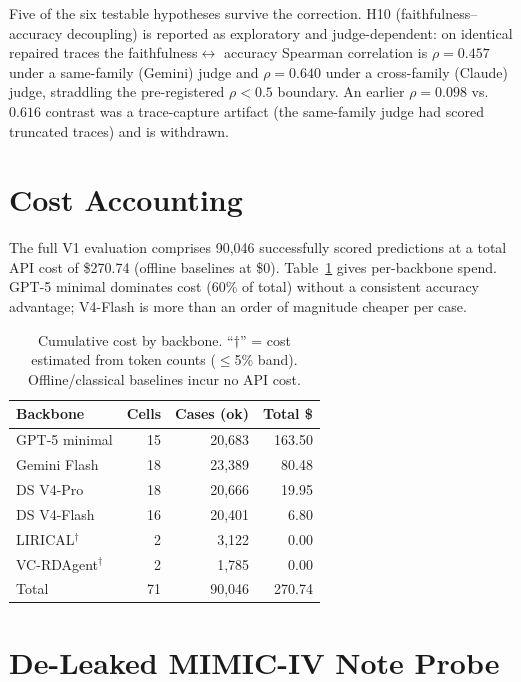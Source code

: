 \documentclass[letterpaper]{article} %
\begin{document}
Five of the six testable hypotheses survive the correction. H10
(faithfulness--accuracy decoupling) is reported as exploratory and
judge-dependent: on identical repaired traces the faithfulness$\leftrightarrow$
accuracy Spearman correlation is $\rho=0.457$ under a same-family (Gemini) judge
and $\rho=0.640$ under a cross-family (Claude) judge, straddling the
pre-registered $\rho<0.5$ boundary. An earlier $\rho=0.098$ vs.\ $0.616$ contrast
was a trace-capture artifact (the same-family judge had scored truncated traces)
and is withdrawn.

\section{Cost Accounting}
\label{app:cost}

The full V1 evaluation comprises 90,046 successfully scored predictions at a
total API cost of \$270.74 (offline baselines at \$0). Table~\ref{tab:cost}
gives per-backbone spend. GPT-5 minimal dominates cost (60\% of total) without a
consistent accuracy advantage; V4-Flash is more than an order of magnitude
cheaper per case.

\begin{table}[h]
\centering
\scriptsize
\setlength{\tabcolsep}{4pt}
\caption{Cumulative cost by backbone. ``$\dagger$'' = cost estimated from token
counts ($\leq$5\% band). Offline/classical baselines incur no API cost.}
\label{tab:cost}
\begin{tabular}{@{}lrrr@{}}
\toprule
Backbone & Cells & Cases (ok) & Total \$ \\
\midrule
GPT-5 minimal & 15 & 20,683 & 163.50 \\
Gemini Flash & 18 & 23,389 & 80.48 \\
DS V4-Pro & 18 & 20,666 & 19.95 \\
DS V4-Flash & 16 & 20,401 & 6.80 \\
LIRICAL$^\dagger$ & 2 & 3,122 & 0.00 \\
VC-RDAgent$^\dagger$ & 2 & 1,785 & 0.00 \\
\midrule
Total & 71 & 90,046 & 270.74 \\
\bottomrule
\end{tabular}
\end{table}

\section{De-Leaked MIMIC-IV Note Probe}
\label{app:mimicnote}
\end{document}
